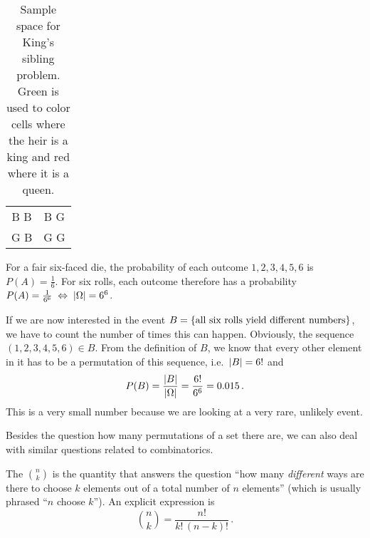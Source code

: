 \begin{table}
\centering

\begin{tabular}{c c}

\cellcolor{green!36} B B & \cellcolor{green!36} B G \\

\cellcolor{green!36} G B & \cellcolor{red!36} G G \\

\end{tabular}

\caption{Sample space for King's sibling problem. Green is used to color cells where the heir is a king and red where it is a queen.}
\label{tab:ss_king_sibling}
\end{table}


\begin{ex}
For a fair six-faced die, the probability of each outcome $1, 2, 3, 4, 5, 6$ is $P(A) = \frac{1}{6}$. For six rolls, each outcome therefore has a probability $P(A) = \frac{1}{6^6} \; \Leftrightarrow \; \abs{\Omega} = 6^6$.

If we are now interested in the event $B = \qty{\text{all six rolls yield different numbers}}$, we have to count the number of times this can happen. Obviously, the sequence $(1, 2, 3, 4, 5, 6) \in B$. From the definition of $B$, we know that every other element in it has to be a permutation of this sequence, i.e.~$\abs{B} = 6!$ and
\begin{equation*}
P(B) = \frac{\abs{B}}{\abs{\Omega}} = \frac{6!}{6^6} = 0.015 \, .
\end{equation*}
This is a very small number because we are looking at a very rare, unlikely event.
\end{ex}


Besides the question how many permutations of a set there are, we can also deal with similar questions related to combinatorics.


\begin{defi}
The  $\binom{n}{k}$ is the quantity that answers the question \enquote{how many \emph{different} ways are there to choose $k$ elements out of a total number of $n$ elements} (which is usually phrased \enquote{$n$ choose $k$}). An explicit expression is
\begin{equation}
\binom{n}{k} = \frac{n!}{k! \, (n - k)!} \, .
\end{equation}
\end{defi}


